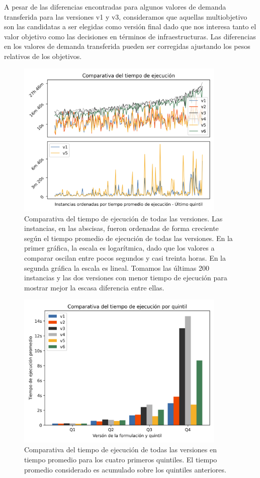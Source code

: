 \documentclass{article}
\begin{document}
  A pesar de las diferencias encontradas para algunos valores de demanda transferida para las versiones v1 y v3, consideramos que aquellas multiobjetivo son las candidatas a ser elegidas como versión final dado que nos interesa tanto el valor objetivo como las decisiones en términos de infraestructuras. Las diferencias en los valores de demanda transferida pueden ser corregidas ajustando los pesos relativos de los objetivos.

  \begin{figure}[h!]
    \centering
    \includegraphics[width=10cm]{../resources/run_time_comparsion.png}
    \caption{Comparativa del tiempo de ejecución de todas las versiones. Las instancias, en las abscisas, fueron ordenadas de forma creciente según el tiempo promedio de ejecución de todas las versiones. En la primer gráfica, la escala es logarítmica, dado que los valores a comparar oscilan entre pocos segundos y casi treinta horas. En la segunda gráfica la escala es lineal. Tomamos las últimas 200 instancias y las dos versiones con menor tiempo de ejecución para mostrar mejor la escasa diferencia entre ellas.}
    \label{fig:runtimecomparison}
  \end{figure}

  \begin{figure}[h!]
    \centering
    \includegraphics[width=10cm]{../resources/run_time_comparsion_by_quintile.png}
      \caption{Comparativa del tiempo de ejecución de todas las versiones en tiempo promedio para los cuatro primeros quintiles. El tiempo promedio considerado es acumulado sobre los quintiles anteriores.}
    \label{fig:firstfourquintiles}
  \end{figure}
\end{document}
